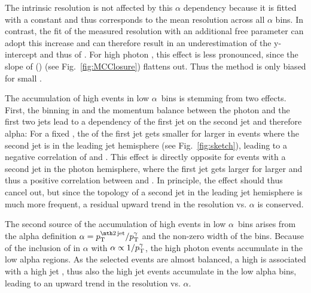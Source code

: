 The intrinsic resolution is not affected by this $\alpha$ dependency because it is fitted with a constant and thus corresponds to the mean resolution across all $\alpha$ bins.
In contrast, the fit of the measured resolution with an additional free parameter can adopt this increase and can therefore result in an underestimation of the y-intercept and thus of \jer. 
For high photon \pt, this effect is less pronounced, since the slope of \jer(\ptgamma) (see Fig.~\ref{fig:MCClosure}) flattens out. Thus the method is only biased for small \ptgamma.

The accumulation of high \ptfirstjet events in low $\alpha$~bins is stemming from two effects.
First, the binning in \ptgamma and the momentum balance between the photon and the first two jets lead to a dependency of the first jet \pt on the second jet \pt and therefore alpha: 
For a fixed \ptgamma, the \pt of the first jet gets smaller for larger \ptsecondjet in events where the second jet is in the leading jet hemisphere (see Fig.~\ref{fig:sketch}), leading to a negative correlation of \ptfirstjet and \ptsecondjet.
This effect is directly opposite for events with a second jet in the photon hemisphere, where the first jet \pt gets larger for larger \ptsecondjet and thus a positive correlation between \ptfirstjet and \ptsecondjet. 
In principle, the effect should thus cancel out, but since the topology of a second jet in the leading jet hemisphere is much more frequent, a residual upward trend in the resolution vs. $\alpha$ is conserved. 

The second source of the accumulation of high \ptfirstjet events in low $\alpha$~bins arises from the alpha definition $\alpha = \ptsecondjet/\ptgamma$ and the non-zero width of the \ptgamma bins. 
Because of the inclusion of \ptgamma in $\alpha$ with $\alpha \propto 1/{p}_\mathrm{T}^{\gamma}$, the high photon \pt events accumulate in the low alpha regions. 
As the selected events are almost balanced, a high \ptgamma is associated with a high jet \pt, thus also the high jet \pt events accumulate in the low alpha bins, leading to  an upward trend in the resolution vs. $\alpha$. \\


